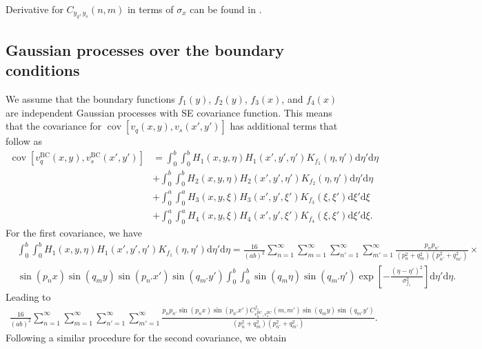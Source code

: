 \documentclass[a4paper,10pt]{article}
\newcommand{\dif}{\textrm{d}}
\DeclareMathOperator{\cov}{cov} \DeclareMathOperator{\ex}{E}
\begin{document}
Derivative for $C_{y_q,y_s}(n,m)$ in terms of $\sigma_x$ can be found
in \cite{Alvarez:HeatEquationReport}.

\subsection*{Gaussian processes over the boundary conditions}

We assume that the boundary functions $f_1(y)$, $f_2(y)$, $f_3(x)$, and $f_4(x)$ are
independent Gaussian processes with SE covariance function. This means that the
covariance for $\cov\left[v_q(x,y),v_s(x',y')\right]$ has additional terms that follow as
  \begin{align*}
    \cov\left[v^{\text{BC}}_q(x,y),v^{\text{BC}}_s(x',y')\right] & =
    \int_0^b\int_0^bH_1(x, y, \eta)H_1(x', y', \eta')K_{f_1}(\eta, \eta')\dif\eta'
    \dif\eta\\
    &+ \int_0^b\int_0^bH_2(x, y, \eta)H_2(x', y', \eta')K_{f_2}(\eta, \eta')\dif\eta'\dif\eta\\
    & + \int_0^a\int_0^aH_3(x, y, \xi)H_3(x', y', \xi')K_{f_3}(\xi, \xi')\dif\xi'
    \dif\xi\\
    &+\int_0^a\int_0^aH_4(x, y, \xi)H_4(x', y', \xi')K_{f_4}(\xi, \xi')\dif\xi'\dif\xi.
  \end{align*}  
For the first covariance, we have
\begin{align*}   
  &  \int_0^b\int_0^bH_1(x, y, \eta)H_1(x', y', \eta')K_{f_1}(\eta, \eta')\dif\eta'
    \dif\eta  = \frac{16}{(ab)^2}\sum_{n=1}^\infty
                  \sum_{m=1}^\infty \sum_{n'=1}^\infty
                  \sum_{m'=1}^\infty\frac{p_n p_{n'}}{(p_n^2 + q_m^2)(p_{n'}^2 + q_{m'}^2)}
                  \times \\
  & \sin\left({p_n x}\right) \sin\left(q_m y\right)\sin\left({p_{n'} x'}\right)
                  \sin\left(q_{m'} y'\right)\int_0^b\int_0^b
                  \sin\left(q_m \eta\right)\sin\left(q_{m'} \eta'\right)
                  \exp\left[-\frac{\left(\eta-\eta'\right)^2}{\sigma^2_{f_1}}\right]\dif\eta'\dif\eta. 
\end{align*}
Leading to
\begin{align*}   
\frac{16}{(ab)^2}\sum_{n=1}^\infty\sum_{m=1}^\infty \sum_{n'=1}^\infty
\sum_{m'=1}^\infty\frac{p_n p_{n'}\sin\left(p_n x\right)\sin\left(p_{n'} x'\right)
      C^{f_1}_{v^{\text{BC}}_q,v^{\text{BC}}_s}(m,m')\sin\left(q_m y\right)\sin\left(q_{m'} y'\right)}
    {(p_n^2 + q_m^2)(p_{n'}^2 + q_{m'}^2)}.
\end{align*}
Following a similar procedure for the second covariance, we obtain
\end{document}
